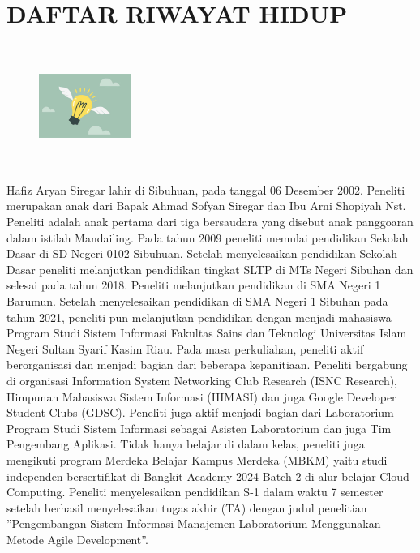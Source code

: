 %
%
%
%

\chapter*{DAFTAR RIWAYAT HIDUP}
\pagestyle{empty}

\noindent
\begin{figure}
	\includegraphics[width=3cm, height=4cm]{konten/gambar/fotoprofil.jpg}
\end{figure}
Hafiz Aryan Siregar lahir di Sibuhuan, pada tanggal 06 Desember 2002. Peneliti merupakan anak dari Bapak Ahmad Sofyan Siregar dan Ibu Arni Shopiyah Nst. Peneliti adalah anak pertama dari tiga bersaudara yang disebut anak panggoaran dalam istilah Mandailing. Pada tahun 2009 peneliti memulai pendidikan Sekolah Dasar di SD Negeri 0102 Sibuhuan. Setelah menyelesaikan pendidikan Sekolah Dasar peneliti melanjutkan pendidikan tingkat SLTP di MTs Negeri Sibuhan dan selesai pada tahun 2018. Peneliti melanjutkan pendidikan di SMA Negeri 1 Barumun. Setelah menyelesaikan pendidikan di SMA Negeri 1 Sibuhan pada tahun 2021, peneliti pun melanjutkan pendidikan dengan menjadi mahasiswa Program Studi Sistem Informasi Fakultas Sains dan Teknologi Universitas Islam Negeri Sultan Syarif Kasim Riau. Pada masa perkuliahan, peneliti aktif berorganisasi dan menjadi bagian dari beberapa kepanitiaan. Peneliti bergabung di organisasi Information System Networking Club Research (ISNC Research), Himpunan Mahasiswa Sistem Informasi (HIMASI) dan juga Google Developer Student Clubs (GDSC). Peneliti juga aktif menjadi bagian dari Laboratorium Program Studi Sistem Informasi sebagai Asisten Laboratorium dan juga Tim Pengembang Aplikasi. Tidak hanya belajar di dalam kelas, peneliti juga mengikuti program Merdeka Belajar Kampus Merdeka (MBKM) yaitu studi independen bersertifikat di Bangkit Academy 2024 Batch 2 di alur belajar Cloud Computing. Peneliti menyelesaikan pendidikan S-1 dalam waktu 7 semester setelah berhasil menyelesaikan tugas akhir (TA) dengan judul penelitian ”Pengembangan Sistem Informasi Manajemen Laboratorium Menggunakan Metode Agile Development”.